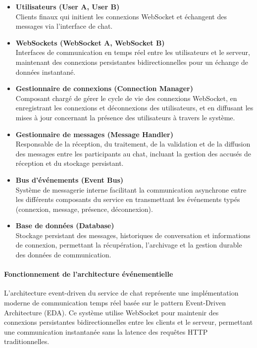 \documentclass{rapportPfe}
\begin{document}
\begin{itemize}
    \item \textbf{Utilisateurs (User A, User B)} \\
    Clients finaux qui initient les connexions WebSocket et échangent des messages via l'interface de chat.
    
    \item \textbf{WebSockets (WebSocket A, WebSocket B)} \\
    Interfaces de communication en temps réel entre les utilisateurs et le serveur, maintenant des connexions persistantes bidirectionnelles pour un échange de données instantané.
    
    \item \textbf{Gestionnaire de connexions (Connection Manager)} \\
    Composant chargé de gérer le cycle de vie des connexions WebSocket, en enregistrant les connexions et déconnexions des utilisateurs, et en diffusant les mises à jour concernant la présence des utilisateurs à travers le système.
    
    \item \textbf{Gestionnaire de messages (Message Handler)} \\
    Responsable de la réception, du traitement, de la validation et de la diffusion des messages entre les participants au chat, incluant la gestion des accusés de réception et du stockage persistant.
    
    \item \textbf{Bus d'événements (Event Bus)} \\
    Système de messagerie interne facilitant la communication asynchrone entre les différents composants du service en transmettant les événements typés (connexion, message, présence, déconnexion).
    
    \item \textbf{Base de données (Database)} \\
    Stockage persistant des messages, historiques de conversation et informations de connexion, permettant la récupération, l'archivage et la gestion durable des données de communication.
\end{itemize}

\paragraph{Fonctionnement de l'architecture événementielle}

L'architecture event-driven du service de chat représente une implémentation moderne de communication temps réel basée sur le pattern Event-Driven Architecture (EDA). Ce système utilise WebSocket pour maintenir des connexions persistantes bidirectionnelles entre les clients et le serveur, permettant une communication instantanée sans la latence des requêtes HTTP traditionnelles. 
\end{document}
